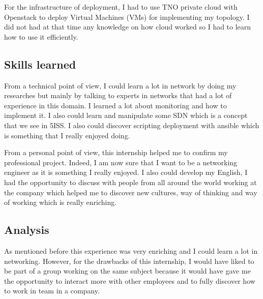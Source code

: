 For the infrastructure of deployment, I had to use TNO private cloud with Openstack to deploy
Virtual Machines (VMs) for implementing my topology. I did not had at that time any knowledge
on how cloud worked so I had to learn how to use it efficiently.

\subsection{Skills learned}

From a technical point of view, I could learn a lot in network by doing my researches but mainly
by talking to experts in networks that had a lot of experience in this domain. I learned a lot about
monitoring and how to implement it. I also could learn and manipulate some SDN which is a concept
that we see in 5ISS. I also could discover scripting deployment with ansible which is something that
I really enjoyed doing.
\smallskip

From a personal point of view, this internship helped me to confirm my professional project.
Indeed, I am now sure that I want to be a networking engineer as it is something I really enjoyed.
I also could develop my English, I had the opportunity to discuss with people from all around the
world working at the company which helped me to discover new cultures, way of thinking and way
of working which is really enriching.


\subsection{Analysis}

As mentioned before this experience was very enriching and I could learn a lot in networking.
However, for the drawbacks of this internship, I would have liked to be part of a group working
on the same subject because it would have gave me the opportunity to interact more with other
employees and to fully discover how to work in team in a company.
